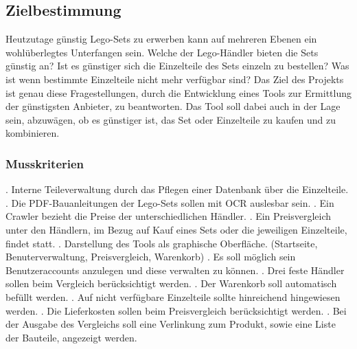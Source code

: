 \subsection{Zielbestimmung}

Heutzutage günstig Lego-Sets zu erwerben kann auf mehreren Ebenen ein wohlüberlegtes Unterfangen sein. Welche der Lego-Händler bieten die Sets günstig an? Ist es günstiger sich die Einzelteile des Sets einzeln zu bestellen? Was ist wenn bestimmte Einzelteile nicht mehr verfügbar sind? \newline
Das Ziel des Projekts ist genau diese Fragestellungen, durch die Entwicklung eines Tools zur Ermittlung der günstigsten Anbieter, zu beantworten. Das Tool soll dabei auch in der Lage sein, abzuwägen, ob es günstiger ist, das Set oder Einzelteile zu kaufen und zu kombinieren.

\subsubsection{Musskriterien}
 . Interne Teileverwaltung durch das Pflegen einer Datenbank über die Einzelteile. \newline 
{} . Die PDF-Bauanleitungen der Lego-Sets sollen mit OCR auslesbar sein. \newline
{} . Ein Crawler bezieht die Preise der unterschiedlichen Händler. \newline
{} . Ein Preisvergleich unter den Händlern, im Bezug auf Kauf eines Sets oder die jeweiligen Einzelteile, findet statt. \newline
{} . Darstellung des Tools als graphische Oberfläche. (Startseite, Benuterverwaltung, Preisvergleich, Warenkorb) \newline
{} . Es soll möglich sein Benutzeraccounts anzulegen und diese verwalten zu können. \newline
{} . Drei feste Händler sollen beim Vergleich berücksichtigt werden. \newline
{} . Der Warenkorb soll automatisch befüllt werden. \newline
{} . Auf nicht verfügbare Einzelteile sollte hinreichend hingewiesen werden. \newline
{} . Die Lieferkosten sollen beim Preisvergleich berücksichtigt werden. \newline 
{} . Bei der Ausgabe des Vergleichs soll eine Verlinkung zum Produkt, sowie eine Liste der Bauteile, angezeigt werden. \newline
